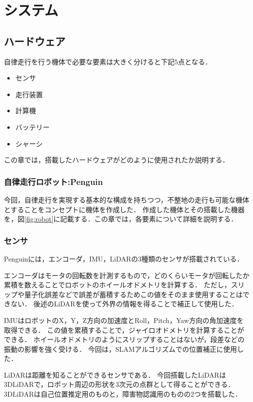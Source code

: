 \section{システム}


\subsection{ハードウェア}
自律走行を行う機体で必要な要素は大きく分けると下記5点となる．

\begin{itemize}
    \item センサ
    \item 走行装置
    \item 計算機
    \item バッテリー
    \item シャーシ
\end{itemize}

この章では，搭載したハードウェアがどのように使用されたか説明する．

\subsubsection{自律走行ロボット:Penguin}
今回，自律走行を実現する基本的な構成を持ちつつ，不整地の走行も可能な機体とすることをコンセプトに機体を作成した． 
作成した機体とその搭載した機器を，図\ref{fig:robot}に記載する．この章では，各要素について詳細を説明する．

\subsubsection{センサ}
Penguinには，エンコーダ，IMU，LiDARの3種類のセンサが搭載されている．

エンコーダはモータの回転数を計測するもので，どのくらいモータが回転したか累積を数えることでロボットのホイールオドメトリを計算する．
ただし，スリップや量子化誤差などで誤差が蓄積するためこの値をそのまま使用することはできない．
後述のLiDARを使って外界の情報を得ることで補正して使用した．

IMUはロボットのX，Y，Z方向の加速度とRoll，Pitch，Yaw方向の角加速度を取得できる．
この値を累積することで，ジャイロオドメトリを計算することができる．
ホイールオドメトリのようにスリップすることはないが，段差などの振動の影響を強く受ける．
今回は，SLAMアルゴリズムでの位置補正に使用した．

LiDARは距離を知ることができるセンサである．
今回搭載したLiDARは3DLiDARで，ロボット周辺の形状を3次元の点群として得ることができる．
3DLiDARは自己位置推定用のものと，障害物認識用のものの2つを搭載した．

